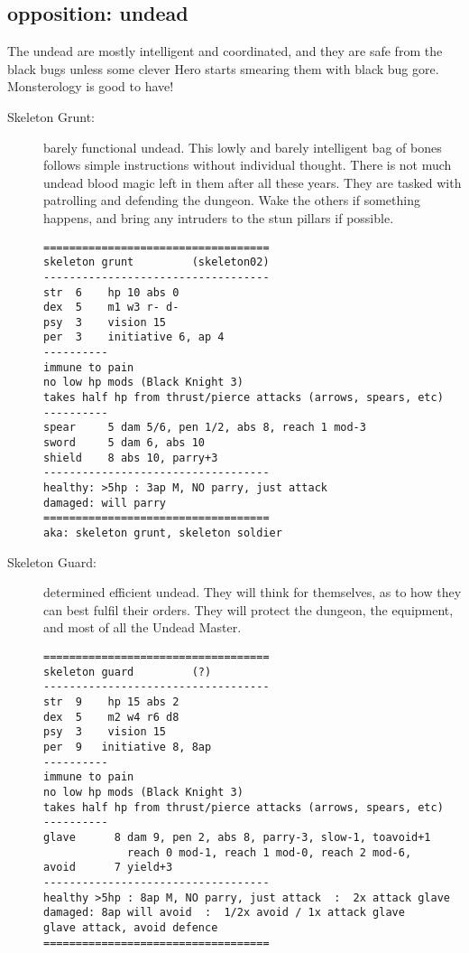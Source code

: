 \subsection*{opposition: undead}

The undead are mostly intelligent and coordinated, and they are safe from the black bugs unless some clever Hero starts smearing them with black bug gore. Monsterology is good to have!

\begin{description}

\item[Skeleton Grunt:] barely functional undead. This lowly and barely intelligent bag of bones follows simple instructions without individual thought. There is not much undead blood magic left in them after all these years. They are tasked with patrolling and defending the dungeon. Wake the others if something happens, and bring any intruders to the stun pillars if possible.
\goodbreak \begin{samepage} \small \begin{verbatim}
===================================
skeleton grunt         (skeleton02)
-----------------------------------
str  6    hp 10 abs 0
dex  5    m1 w3 r- d-
psy  3    vision 15
per  3    initiative 6, ap 4
----------
immune to pain
no low hp mods (Black Knight 3)
takes half hp from thrust/pierce attacks (arrows, spears, etc)
----------
spear     5 dam 5/6, pen 1/2, abs 8, reach 1 mod-3
sword     5 dam 6, abs 10
shield    8 abs 10, parry+3
-----------------------------------
healthy: >5hp : 3ap M, NO parry, just attack
damaged: will parry
===================================
aka: skeleton grunt, skeleton soldier
\end{verbatim} \normalsize \end{samepage}


\item[Skeleton Guard:] determined efficient undead. They will think for themselves, as to how they can best fulfil their orders. They will protect the dungeon, the equipment, and most of all the Undead Master.
\goodbreak \begin{samepage} \small \begin{verbatim}
===================================
skeleton guard         (?)
-----------------------------------
str  9    hp 15 abs 2
dex  5    m2 w4 r6 d8
psy  3    vision 15
per  9   initiative 8, 8ap
----------
immune to pain
no low hp mods (Black Knight 3)
takes half hp from thrust/pierce attacks (arrows, spears, etc)
----------
glave      8 dam 9, pen 2, abs 8, parry-3, slow-1, toavoid+1
             reach 0 mod-1, reach 1 mod-0, reach 2 mod-6,
avoid      7 yield+3
-----------------------------------
healthy >5hp : 8ap M, NO parry, just attack  :  2x attack glave
damaged: 8ap will avoid  :  1/2x avoid / 1x attack glave
glave attack, avoid defence
===================================
\end{verbatim} \normalsize \end{samepage}



\end{description}

